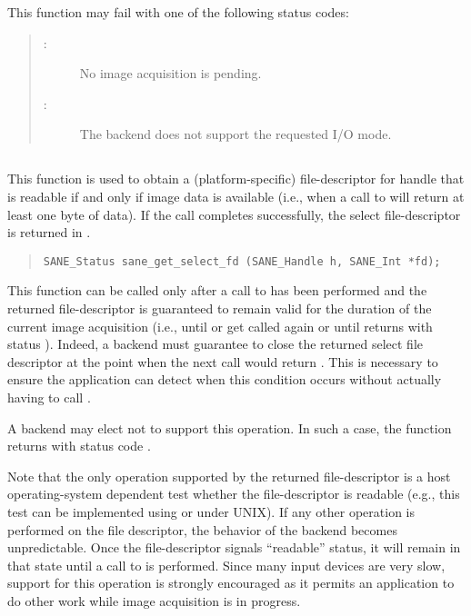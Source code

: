 \documentclass[11pt,DVIps]{report}
\begin{document}
This function may fail with one of the following status codes:
\begin{quote}
\begin{description}
\item[:] No image acquisition is pending.
\item[:] The backend does not support
  the requested I/O mode.
\end{description}
\end{quote}


\subsection{}

This function is used to obtain a (platform-specific) file-descriptor
for handle  that is readable if and only if image data is
available (i.e., when a call to  will return at
least one byte of data).  If the call completes successfully, the
select file-descriptor is returned in .
\begin{quote}
\begin{verbatim}
SANE_Status sane_get_select_fd (SANE_Handle h, SANE_Int *fd);
\end{verbatim}
\end{quote}
This function can be called only after a call to 
has been performed and the returned file-descriptor is guaranteed to
remain valid for the duration of the current image acquisition (i.e.,
until  or  get called again
or until  returns with status
).  Indeed, a backend must guarantee to
close the returned select file descriptor at the point when the next
 call would return .
This is necessary to ensure the application can detect when this
condition occurs without actually having to call .

A backend may elect not to support this operation.  In such a case,
the function returns with status code
.

Note that the only operation supported by the returned file-descriptor
is a host operating-system dependent test whether the file-descriptor
is readable (e.g., this test can be implemented using 
or  under UNIX).  If any other operation is performed on
the file descriptor, the behavior of the backend becomes
unpredictable.  Once the file-descriptor signals ``readable'' status,
it will remain in that state until a call to  is
performed.  Since many input devices are very slow, support for this
operation is strongly encouraged as it permits an application to do
other work while image acquisition is in progress.
\end{document}
